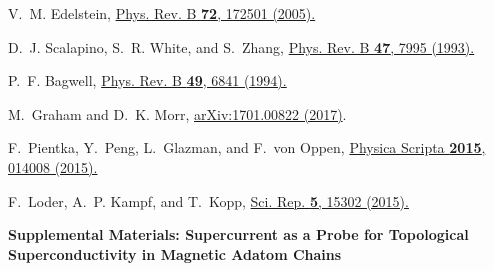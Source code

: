 \documentclass[aps,prl,reprint,nobibnotes]{revtex4-1}
\begin{document}
\begin{thebibliography}{10}
V.~M. Edelstein,
\newblock \href{https://doi.org/10.1103/PhysRevB.72.172501}{Phys. Rev. B {\bf 72}, 172501 (2005).}

D.~J. Scalapino, S.~R. White, and S.~Zhang,
\newblock \href{https://doi.org/10.1103/PhysRevB.47.7995}{Phys. Rev. B {\bf 47}, 7995 (1993).}

P.~F. Bagwell,
\newblock \href{https://doi.org/10.1103/PhysRevB.49.6841}{Phys. Rev. B {\bf 49}, 6841 (1994).}

M.~{Graham} and D.~K. {Morr},
\newblock \href{https://arxiv.org/abs/1701.00822}{arXiv:1701.00822  (2017)}.

F.~Pientka, Y.~Peng, L.~Glazman, and F.~von Oppen,
\newblock \href{http://dx.doi.org/10.1088/0031-8949/2015/T164/014008}{Physica Scripta {\bf 2015}, 014008 (2015).}

F.~Loder, A.~P. Kampf, and T.~Kopp,
\newblock \href{https://doi.org/10.1038/srep15302}{Sci. Rep. {\bf 5}, 15302 (2015).}

\end{thebibliography}

















\newpage
\newpage
\clearpage
\widetext
\begin{center}
\textbf{\large Supplemental Materials: Supercurrent as a Probe for Topological Superconductivity in Magnetic Adatom Chains}
\end{center}
\setcounter{equation}{0}
\setcounter{figure}{0}
\setcounter{table}{0}
\setcounter{page}{1}
\makeatletter
\renewcommand{\theequation}{E\arabic{equation}}
\renewcommand{\thefigure}{F\arabic{figure}}
\renewcommand{\bibnumfmt}[1]{[R#1]}
\renewcommand{\citenumfont}[1]{R#1}
\end{document}
